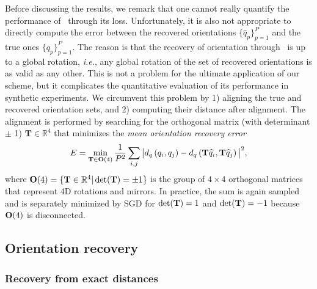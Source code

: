 Before discussing the results, we remark that one cannot really quantify the performance of~ through its loss.
Unfortunately, it is also not appropriate to directly compute the error between the recovered orientations $\big\{\widehat{q}_p\big\}_{p=1}^P$ and the true ones $\big\{q_p\big\}_{p=1}^P$.
The reason is that the recovery of orientation through~ is up to a global rotation, \textit{i.e.}, any global rotation of the set of recovered orientations is as valid as any other.
This is not a problem for the ultimate application of our scheme, but it complicates the quantitative evaluation of its performance in synthetic experiments.
We circumvent this problem by 1) aligning the true and recovered orientation sets, and 2) computing their distance after alignment.
The alignment is performed by searching for the orthogonal matrix (with determinant $\pm$ 1) $\mathbf{T}\in\mathbb{R}^4$  that minimizes
 the \textit{mean orientation recovery error}
\begin{equation}
    E = \min_{\mathbf{T} \in \mathrm{\mathbf{O}}(4)} \frac{1}{P^2} \sum_{i,j} \big| d_q\left(q_i,q_j\right)- d_q\left(\mathbf{T}\widehat{q}_i,\mathbf{T}\widehat{q}_j\right) \big|^2,
    \label{eqn:orientation-recovery-error}
\end{equation}
where $\mathrm{\mathbf{O}}(4) = \{\mathbf{T} \in \mathbb{R}^4 | \det(\mathbf{T}) = \pm 1\}$ is the group of $4 \times 4$ orthogonal matrices that represent 4D rotations and mirrors.
In practice, the sum is again sampled and  is separately minimized by SGD for $\det(\mathbf{T}) = 1$ and $\det(\mathbf{T}) = -1$ because $\mathrm{\mathbf{O}}(4)$ is disconnected.

\subsection{Orientation recovery}\label{sec:results:orientation-recovery}


\subsubsection{Recovery from exact distances}\label{sec:results:orientation-recovery:exact}

